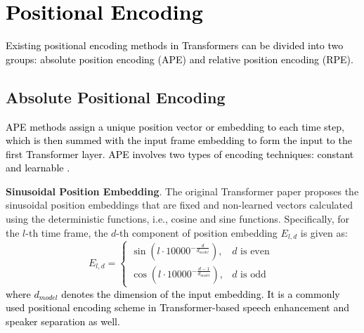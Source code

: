 \documentclass[journal]{IEEEtran}
\newcommand{\qian}[1]{{\color{magenta}#1}}
\begin{document}

\section{\textcolor{black}{Positional Encoding}} \label{sec:3}
\textcolor{black}{Existing positional encoding methods in Transformers can be divided into two groups: absolute position encoding (APE) and relative position encoding (RPE).}

\subsection{Absolute Positional Encoding}

\textcolor{black}{APE methods assign a unique position vector or embedding to each time step, which is then summed with the input frame embedding to form the input to the first Transformer layer. APE involves two types of encoding techniques: constant \cite{attention2017} and learnable \cite{bert}.}

\textbf{Sinusoidal Position Embedding}. The original Transformer paper proposes the sinusoidal position embeddings \cite{attention2017} that are fixed and non-learned vectors calculated using the deterministic functions, i.e., cosine and sine functions. Specifically, for the $l$-th time frame, the $d$-th component of position embedding $E_{l,d}$ is given as: 
\begin{equation}
E_{l,d}\!=
\begin{cases}
\sin\left(l \cdot 10000^{-\frac{d}{d_{model}}}\right), & d \text{ is even } \\
\cos\left(l \cdot 10000^{-\frac{d-1}{d_{model}}} \right), & d \text{ is odd }
\end{cases}
\end{equation}
\textcolor{black}{where $d_{model}$ denotes the dimension of the input embedding. It is a commonly used positional encoding scheme in Transformer-based speech enhancement \cite{sepformerstft} and speaker separation \cite{sepformer} as well.}
\end{document}
